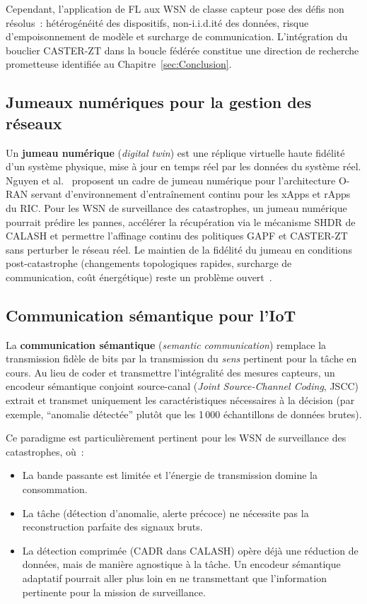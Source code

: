 Cependant, l'application de FL aux WSN de classe capteur pose des défis non résolus~: hétérogénéité des dispositifs, non-i.i.d.ité des données, risque d'empoisonnement de modèle et surcharge de communication. L'intégration du bouclier CASTER-ZT dans la boucle fédérée constitue une direction de recherche prometteuse identifiée au Chapitre~\ref{sec:Conclusion}.

\subsection{Jumeaux numériques pour la gestion des réseaux}

Un \textbf{jumeau numérique} (\emph{digital twin}) est une réplique virtuelle haute fidélité d'un système physique, mise à jour en temps réel par les données du système réel. Nguyen et al.\ \cite{Nguyen2024DTORAN} proposent un cadre de jumeau numérique pour l'architecture O-RAN servant d'environnement d'entraînement continu pour les xApps et rApps du RIC. Pour les WSN de surveillance des catastrophes, un jumeau numérique pourrait prédire les pannes, accélérer la récupération via le mécanisme SHDR de CALASH et permettre l'affinage continu des politiques GAPF et CASTER-ZT sans perturber le réseau réel. Le maintien de la fidélité du jumeau en conditions post-catastrophe (changements topologiques rapides, surcharge de communication, coût énergétique) reste un problème ouvert~\cite{saad2020vision6g}.

\subsection{Communication sémantique pour l'IoT}

La \textbf{communication sémantique} (\emph{semantic communication}) remplace la transmission fidèle de bits par la transmission du \emph{sens} pertinent pour la tâche en cours. Au lieu de coder et transmettre l'intégralité des mesures capteurs, un encodeur sémantique conjoint source-canal (\emph{Joint Source-Channel Coding}, JSCC) extrait et transmet uniquement les caractéristiques nécessaires à la décision (par exemple, ``anomalie détectée'' plutôt que les 1\,000 échantillons de données brutes).

Ce paradigme est particulièrement pertinent pour les WSN de surveillance des catastrophes, où~:
\begin{itemize}
    \item La bande passante est limitée et l'énergie de transmission domine la consommation.
    \item La tâche (détection d'anomalie, alerte précoce) ne nécessite pas la reconstruction parfaite des signaux bruts.
    \item La détection comprimée (CADR dans CALASH) opère déjà une réduction de données, mais de manière agnostique à la tâche. Un encodeur sémantique adaptatif pourrait aller plus loin en ne transmettant que l'information pertinente pour la mission de surveillance.
\end{itemize}

